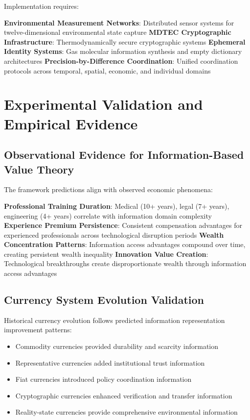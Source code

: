 \documentclass[12pt,a4paper]{article}
\begin{document}
Implementation requires:

\textbf{Environmental Measurement Networks}: Distributed sensor systems for twelve-dimensional environmental state capture
\textbf{MDTEC Cryptographic Infrastructure}: Thermodynamically secure cryptographic systems
\textbf{Ephemeral Identity Systems}: Gas molecular information synthesis and empty dictionary architectures
\textbf{Precision-by-Difference Coordination}: Unified coordination protocols across temporal, spatial, economic, and individual domains

\section{Experimental Validation and Empirical Evidence}

\subsection{Observational Evidence for Information-Based Value Theory}

The framework predictions align with observed economic phenomena:

\textbf{Professional Training Duration}: Medical (10+ years), legal (7+ years), engineering (4+ years) correlate with information domain complexity
\textbf{Experience Premium Persistence}: Consistent compensation advantages for experienced professionals across technological disruption periods
\textbf{Wealth Concentration Patterns}: Information access advantages compound over time, creating persistent wealth inequality
\textbf{Innovation Value Creation}: Technological breakthroughs create disproportionate wealth through information access advantages

\subsection{Currency System Evolution Validation}

Historical currency evolution follows predicted information representation improvement patterns:
\begin{itemize}
\item Commodity currencies provided durability and scarcity information
\item Representative currencies added institutional trust information
\item Fiat currencies introduced policy coordination information
\item Cryptographic currencies enhanced verification and transfer information
\item Reality-state currencies provide comprehensive environmental information
\end{itemize}
\end{document}
